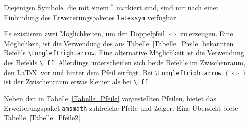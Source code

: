\documentclass[a4paper,10pt,twoside]{scrbook}
\begin{document}
Diejenigen Symbole, die mit einem $^\ast$ markiert sind, sind nur nach einer
Einbindung des Erweiterungspaketes \texttt{latexsym} verfügbar

Es existieren zwei Möglichkeiten, um den Doppelpfeil $\Longleftrightarrow$ zu erzeugen.
Eine Möglichkeit, ist die Verwendung des aus Tabelle~\ref{Tabelle_Pfeile} bekannten Befehls
\verb!\Longleftrightarrow!. Eine alternative Möglichkeit ist die Verwendung des Befehls
\verb!\iff!. Allerdings unterscheiden sich beide
Befehle im Zwischenraum, den \LaTeX\ vor und hinter dem Pfeil einfügt.
Bei \verb!\Longleftrightarrow! $(\Longleftrightarrow)$
ist der Zwischenraum etwas kleiner als bei \verb!\iff! 

Neben den in Tabelle~\ref{Tabelle_Pfeile} vorgestellten Pfeilen, 
bietet das Erweiterungspaket \texttt{amsmath} zahlreiche
Pfeile und Zeiger. Eine Übersicht biete Tabelle~\ref{Tabelle_Pfeile2}
\end{document}
